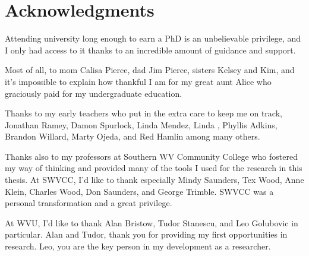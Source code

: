 
\chapter{Acknowledgments}

Attending university long enough to earn a PhD is an unbelievable privilege, and I only had access to it thanks to an incredible amount of guidance and support.

Most of all, to \DIFaddbegin {}\DIFaddend mom Calisa Pierce, dad Jim Pierce, \DIFdelbegin {}\DIFdelend sisters Kelsey and Kim, and \DIFdelbegin {}\DIFdelend \DIFaddbegin {}\DIFaddend it's impossible to explain how thankful I am for \DIFdelbegin {}\DIFdelend \DIFaddbegin {}\DIFaddend my great aunt Alice who graciously paid for my undergraduate education.

Thanks to my early teachers who put in the extra care to keep me on track, Jonathan Ramey, \DIFaddbegin {}\DIFaddend Damon Spurlock, Linda Mendez, Linda \DIFdelbegin {}\DIFdelend \DIFaddbegin {}\DIFaddend , Phyllis Adkins, Brandon Willard, Marty Ojeda, and Red Hamlin among many others.

Thanks also to my professors at Southern WV Community College who fostered my way of thinking and provided many of the tools I used for the research in this thesis.
At SWVCC, I'd like to thank especially Mindy Saunders, Tex Wood, Anne Klein, Charles Wood, Don Saunders, and George Trimble. \DIFdelbegin {}\DIFdelend SWVCC was a personal transformation and a great privilege. 

At WVU, I'd like to thank Alan Bristow, Tudor Stanescu, and Leo Golubovic in particular. Alan and Tudor, thank you for providing my first opportunities in research. Leo, you are the key person in my development as a researcher.
\DIFdelbegin {}\DIFdelend 

